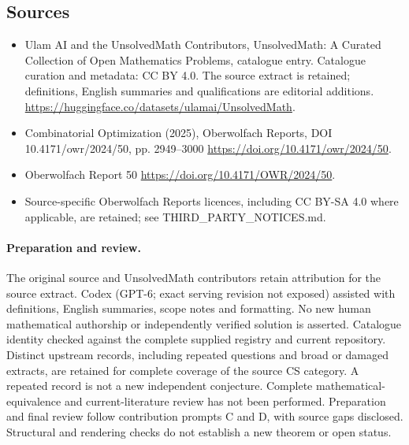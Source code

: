 \documentclass[11pt]{article}
\begin{document}
\subsection{Sources}
\begin{itemize}
\item[\hypertarget{source:statement:1}{S1}] Ulam AI and the UnsolvedMath Contributors, UnsolvedMath: A Curated Collection of Open Mathematics Problems, catalogue entry. Catalogue curation and metadata: CC BY 4.0. The source extract is retained; definitions, English summaries and qualifications are editorial additions.
\url{https://huggingface.co/datasets/ulamai/UnsolvedMath}.
\item[\hypertarget{source:statement:2}{S2}] Combinatorial Optimization (2025), Oberwolfach Reports, DOI 10.4171/owr/2024/50, pp. 2949--3000
\url{https://doi.org/10.4171/owr/2024/50}.
\item[\hypertarget{source:statement:3}{S3}] Oberwolfach Report 50
\url{https://doi.org/10.4171/OWR/2024/50}.
\item Source-specific Oberwolfach Reports licences, including CC BY-SA 4.0 where applicable, are retained; see THIRD\_PARTY\_NOTICES.md.
\end{itemize}
\paragraph{Preparation and review.}
The original source and UnsolvedMath contributors retain attribution for the source extract. Codex (GPT-6; exact serving revision not exposed) assisted with definitions, English summaries, scope notes and formatting. No new human mathematical authorship or independently verified solution is asserted. Catalogue identity checked against the complete supplied registry and current repository. Distinct upstream records, including repeated questions and broad or damaged extracts, are retained for complete coverage of the source CS category. A repeated record is not a new independent conjecture. Complete mathematical-equivalence and current-literature review has not been performed. Preparation and final review follow contribution prompts C and D, with source gaps disclosed. Structural and rendering checks do not establish a new theorem or open status.
\label{end:statement}
\end{document}
